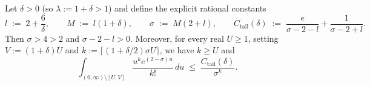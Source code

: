\begin{proposition}
\label{prop:02:chernoff}
Let $\delta > 0$ (so $\lambda := 1 + \delta > 1$) and define the explicit rational constants
\begin{equation}
\label{eq:02:chernoff-params}
  l \;:=\; 2 + \frac{6}{\delta}, \qquad
  M \;:=\; l(1 + \delta), \qquad
  \sigma \;:=\; M(2 + l), \qquad
  C_{\mathrm{tail}}(\delta) \;:=\; \frac{e}{\sigma - 2 - l} + \frac{1}{\sigma - 2 + l}.
\end{equation}
Then $\sigma > 4 > 2$ and $\sigma - 2 - l > 0$. Moreover, for every real $U \ge 1$, setting $V := (1 + \delta)U$ and $k := \lceil (1 + \delta/2)\sigma U \rceil$, we have $k \ge U$ and
\begin{equation}
\label{eq:02:chernoff-bound}
  \int_{(0, \infty) \setminus [U, V]} \frac{u^k e^{(2-\sigma)u}}{k!}\,du \;\le\; \frac{C_{\mathrm{tail}}(\delta)}{\sigma^k}.
\end{equation}
\end{proposition}

